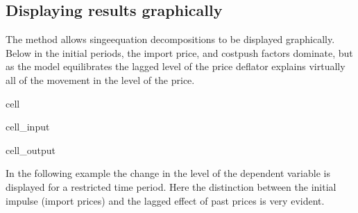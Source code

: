 \documentclass[letterpaper,10pt,english]{jupyterBook}
\begin{document}
\subsection{Displaying  results graphically}
\label{\detokenize{content/06_ModelAnalytics/AttributionSomeFeatures:displaying-dekomp-results-graphically}}
\sphinxAtStartPar
The  method allows singe\sphinxhyphen{}equation decompositions to be displayed graphically. Below in the initial periods, the import price, and cost\sphinxhyphen{}push factors dominate, but as the model equilibrates the lagged level of the price deflator explains virtually all of the movement in the level of the price.

\begin{sphinxuseclass}{cell}\begin{sphinxVerbatimInput}

\begin{sphinxuseclass}{cell_input}
\begin{sphinxVerbatim}[commandchars=\\\{\}]
 
\end{sphinxVerbatim}

\end{sphinxuseclass}\end{sphinxVerbatimInput}
\begin{sphinxVerbatimOutput}

\begin{sphinxuseclass}{cell_output}
\noindent{}

\end{sphinxuseclass}\end{sphinxVerbatimOutput}

\end{sphinxuseclass}
\sphinxAtStartPar
In the following example the change in the level of the dependent variable is displayed for a restricted time period.  Here the distinction between the initial impulse (import prices) and the lagged effect of past prices is very evident.
\end{document}
